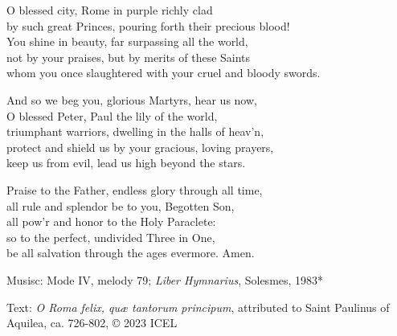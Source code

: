 \hymn

\begin{hymnverse}
O blessed city, Rome in purple richly clad\\
by such great Princes, pouring forth their precious blood!\\
You shine in beauty, far surpassing all the world,\\
not by your praises, but by merits of these Saints\\
whom you once slaughtered with your cruel and bloody swords.

And so we beg you, glorious Martyrs, hear us now,\\
O blessed Peter, Paul the lily of the world,\\
triumphant warriors, dwelling in the halls of heav’n,\\
protect and shield us by your gracious, loving prayers,\\
keep us from evil, lead us high beyond the stars.

Praise to the Father, endless glory through all time,\\
all rule and splendor be to you, Begotten Son,\\
all pow’r and honor to the Holy Paraclete:\\
so to the perfect, undivided Three in One,\\
be all salvation through the ages evermore. Amen.
\end{hymnverse}

\begin{hymnsource}
Musisc: Mode IV, melody 79; \emph{Liber Hymnarius}, Solesmes, 1983*

Text: \emph{O Roma felix, quæ tantorum principum}, attributed to Saint Paulinus of Aquilea, ca. 726-802, © 2023 ICEL
\end{hymnsource}
